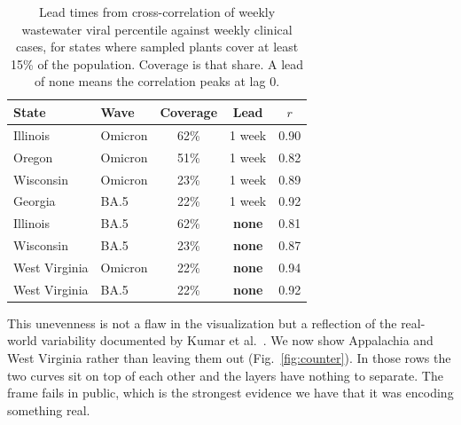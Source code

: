\begin{table}[t]
  \centering
  \caption{Lead times from cross-correlation of weekly wastewater viral
  percentile against weekly clinical cases, for states where sampled plants cover
  at least 15\% of the population. Coverage is that share. A lead of none means
  the correlation peaks at lag 0.}
  \label{tab:leads}
  \begin{tabular}{llccc}
    \toprule
    State & Wave & Coverage & Lead & $r$ \\
    \midrule
    Illinois      & Omicron & 62\% & 1 week        & 0.90 \\
    Oregon        & Omicron & 51\% & 1 week        & 0.82 \\
    Wisconsin     & Omicron & 23\% & 1 week        & 0.89 \\
    Georgia       & BA.5    & 22\% & 1 week        & 0.92 \\
    Illinois      & BA.5    & 62\% & \textbf{none} & 0.81 \\
    Wisconsin     & BA.5    & 23\% & \textbf{none} & 0.87 \\
    West Virginia & Omicron & 22\% & \textbf{none} & 0.94 \\
    West Virginia & BA.5    & 22\% & \textbf{none} & 0.92 \\
    \bottomrule
  \end{tabular}
\end{table}

This unevenness is not a flaw in the visualization but a reflection of the
real-world variability documented by Kumar et al.~\cite{kumar2022}. We now show
Appalachia and West Virginia rather than leaving them out
(Fig.~\ref{fig:counter}). In those rows the two curves sit on top of each other
and the layers have nothing to separate. The frame fails in public, which is the
strongest evidence we have that it was encoding something real.
